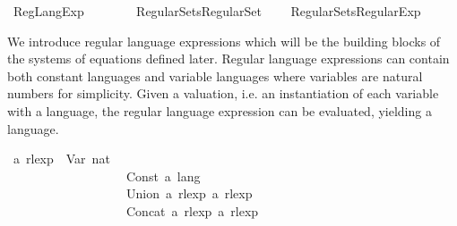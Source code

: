%
\begin{isabellebody}%
%
%
\isadelimdocument
%
\endisadelimdocument
%
\isatagdocument
%
\isamarkuptrue%
%
\endisatagdocument
{\isafolddocument}%
%
\isadelimdocument
%
\endisadelimdocument
%
\isadelimtheory
%
\endisadelimtheory
%
\isatagtheory
{}\isamarkupfalse%
\ Reg{\isacharunderscore}{\kern0pt}Lang{\isacharunderscore}{\kern0pt}Exp\isanewline
\ \ \ \isanewline
\ \ \ \ {\isachardoublequoteopen}Regular{\isacharminus}{\kern0pt}Sets{\isachardot}{\kern0pt}Regular{\isacharunderscore}{\kern0pt}Set{\isachardoublequoteclose}\isanewline
\ \ \ \ {\isachardoublequoteopen}Regular{\isacharminus}{\kern0pt}Sets{\isachardot}{\kern0pt}Regular{\isacharunderscore}{\kern0pt}Exp{\isachardoublequoteclose}\isanewline
{}%
\endisatagtheory
{\isafoldtheory}%
%
\isadelimtheory
%
\endisadelimtheory
%
\isadelimdocument
%
\endisadelimdocument
%
\isatagdocument
%
\isamarkuptrue%
%
\endisatagdocument
{\isafolddocument}%
%
\isadelimdocument
%
\endisadelimdocument
%
\begin{isamarkuptext}%
We introduce regular language expressions which will be the building blocks of the systems of
equations defined later. Regular language expressions can contain both constant languages and
variable languages where variables are natural numbers for simplicity. Given a valuation, i.e. an
instantiation of each variable with a language, the regular language expression can be evaluated,
yielding a language.%
\end{isamarkuptext}\isamarkuptrue%
\isamarkupfalse%
\ {\isacharprime}{\kern0pt}a\ rlexp\ {\isacharequal}{\kern0pt}\ Var\ nat\ \ \ \ \ \ \ \ \ \ \ \ \ \ \ \ \ \ \ \ \ \ \ \ \ \ \isanewline
\ \ \ \ \ \ \ \ \ \ \ \ \ \ \ \ \ \ {\isacharbar}{\kern0pt}\ Const\ {\isachardoublequoteopen}{\isacharprime}{\kern0pt}a\ lang{\isachardoublequoteclose}\ \ \ \ \ \ \ \ \ \ \ \ \ \ \ \ \ \ \isanewline
\ \ \ \ \ \ \ \ \ \ \ \ \ \ \ \ \ \ {\isacharbar}{\kern0pt}\ Union\ {\isachardoublequoteopen}{\isacharprime}{\kern0pt}a\ rlexp{\isachardoublequoteclose}\ {\isachardoublequoteopen}{\isacharprime}{\kern0pt}a\ rlexp{\isachardoublequoteclose}\isanewline
\ \ \ \ \ \ \ \ \ \ \ \ \ \ \ \ \ \ {\isacharbar}{\kern0pt}\ Concat\ {\isachardoublequoteopen}{\isacharprime}{\kern0pt}a\ rlexp{\isachardoublequoteclose}\ {\isachardoublequoteopen}{\isacharprime}{\kern0pt}a\ rlexp{\isachardoublequoteclose}\ \ \ \ \ \isanewline

\end{isabellebody}
